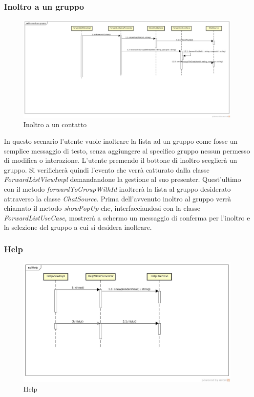 \subsubsection{Inoltro a un gruppo}

\label{Inoltro a un contatto}
\begin{figure}[H]
	\centering
	\includegraphics[width=\textwidth]{Sezioni/Diagrammi/App/forward_con_gruppo.jpg}
	\caption{Inoltro a un contatto}
	
\end{figure}

In questo scenario l'utente vuole inoltrare la lista ad un gruppo come fosse un semplice messaggio di testo, senza aggiungere al specifico gruppo nessun permesso di modifica o interazione. L'utente premendo il bottone di inoltro sceglierà un gruppo. Si verificherà quindi l'evento che verrà catturato dalla classe \textit{ForwardListViewImpl} demandandone la gestione al suo presenter.
Quest'ultimo con il metodo \textit{forwardToGroupWithId} inoltrerà la lista al gruppo desiderato attraverso la classe \textit{ChatSource}. Prima dell'avvenuto inoltro al gruppo verrà chiamato il metodo \textit{showPopUp} che, interfacciandosi con la classe \textit{ForwardListUseCase}, mostrerà a schermo un messaggio di conferma per l'inoltro e la selezione del gruppo a cui si desidera inoltrare.


\subsubsection{Help}

\label{Help}
\begin{figure}[H]
	\centering
	\includegraphics[width=\textwidth]{Sezioni/Diagrammi/App/Help.jpg}
	\caption{Help}
	
\end{figure}

